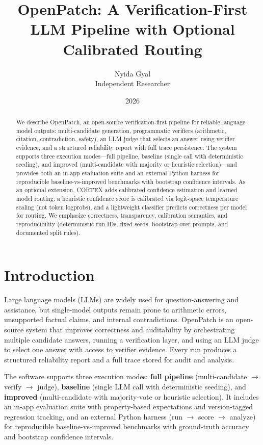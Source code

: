 \documentclass[11pt]{article}
\title{OpenPatch: A Verification-First LLM Pipeline with Optional Calibrated Routing}
\author{Nyida Gyal\\
  Independent Researcher}
\date{2026}
\begin{document}
\maketitle

\begin{abstract}
We describe OpenPatch, an open-source verification-first pipeline for reliable language model outputs: multi-candidate generation, programmatic verifiers (arithmetic, citation, contradiction, safety), an LLM judge that selects an answer using verifier evidence, and a structured reliability report with full trace persistence. The system supports three execution modes---full pipeline, baseline (single call with deterministic seeding), and improved (multi-candidate with majority or heuristic selection)---and provides both an in-app evaluation suite and an external Python harness for reproducible baseline-vs-improved benchmarks with bootstrap confidence intervals. As an optional extension, CORTEX adds calibrated confidence estimation and learned model routing: a heuristic confidence score is calibrated via logit-space temperature scaling (not token logprobs), and a lightweight classifier predicts correctness per model for routing. We emphasize correctness, transparency, calibration semantics, and reproducibility (deterministic run IDs, fixed seeds, bootstrap over prompts, and documented split rules).
\end{abstract}

\section{Introduction}
\label{sec:intro}

Large language models (LLMs) are widely used for question-answering and assistance, but single-model outputs remain prone to arithmetic errors, unsupported factual claims, and internal contradictions. OpenPatch is an open-source system that improves correctness and auditability by orchestrating multiple candidate answers, running a verification layer, and using an LLM judge to select one answer with access to verifier evidence. Every run produces a structured reliability report and a full trace stored for audit and analysis.

The software supports three execution modes: \textbf{full pipeline} (multi-candidate $\to$ verify $\to$ judge), \textbf{baseline} (single LLM call with deterministic seeding), and \textbf{improved} (multi-candidate with majority-vote or heuristic selection). It includes an in-app evaluation suite with property-based expectations and version-tagged regression tracking, and an external Python harness (run $\to$ score $\to$ analyze) for reproducible baseline-vs-improved benchmarks with ground-truth accuracy and bootstrap confidence intervals.
\end{document}

